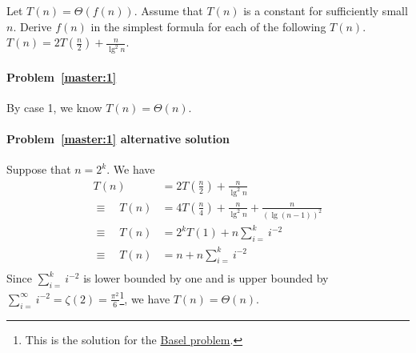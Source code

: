 \begin{Exercise}[origin={NCTU CSIE 104}]
Let $T(n) = \Theta(f(n))$. Assume that $T(n)$ is a constant for sufficiently small $n$. Derive $f(n)$ in the simplest formula for each of the following $T(n)$.
\Question $T(n) = 2T(\frac{n}{2}) + \frac{n}{\lg^2 n}$. \label{master:1}
\end{Exercise}
\begin{Answer}

\paragraph{Problem~\ref{master:1}} By case 1, we know $T(n) = \Theta(n)$.

\paragraph{Problem~\ref{master:1} alternative solution} Suppose that $n = 2^k$. We have
\begin{align*}
T(n) &= 2T(\frac{n}{2}) + \frac{n}{\lg^2 n} \\
\equiv \quad T(n) &= 4T(\frac{n}{4}) + \frac{n}{\lg^2 n} + \frac{n}{(\lg (n-1))^2} \\
\equiv \quad T(n) &= 2^k T(1) + n \sum_{i=}^k i^{-2} \\
\equiv \quad T(n) &= n + n \sum_{i=}^k i^{-2} \\
\end{align*}
Since $\sum_{i=}^k i^{-2}$ is lower bounded by one and is upper bounded by $\sum_{i=}^{\infty} i^{-2} = \zeta(2) = \frac{\pi^2}{6}$\footnote{This is the solution for the \href{https://en.wikipedia.org/wiki/Basel_problem}{Basel problem}.}, we have $T(n) = \Theta(n)$.
\end{Answer}

